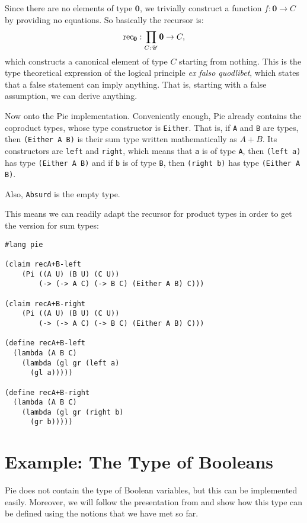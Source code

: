 Since there are no elements of type $ \pmb{0} $, we trivially construct
a function $ f : \pmb{0} \to C $ by providing no equations. So basically
the recursor is:
\[
  \mathrm{rec}_{\pmb{0}} : \prod_{C : \mathscr{U}} \pmb{0} \to C,
\]
which constructs a canonical element of type $ C $ starting from nothing.
This is the type theoretical expression of the logical principle
\emph{ex falso quodlibet}, which states that a false statement can imply
anything. That is, starting with a false assumption, we can derive anything.

\vspace{0.3cm}

Now onto the Pie implementation. Conveniently enough, Pie already contains
the coproduct types, whose type constructor is \texttt{Either}. That is,
if \texttt{A} and \texttt{B} are types, then \texttt{(Either A B)} is their
sum type written mathematically as $ A + B $. Its constructors are
\texttt{left} and \texttt{right}, which means that \texttt{a} is of type
\texttt{A}, then \texttt{(left a)} has type \texttt{(Either A B)}
and if \texttt{b} is of type \texttt{B}, then \texttt{(right b)} has
type \texttt{(Either A B)}.

Also, \texttt{Absurd} is the empty type.

This means we can readily adapt the recursor for product types in order to
get the version for sum types:
{
  \small
\begin{verbatim}
#lang pie

(claim recA+B-left
    (Pi ((A U) (B U) (C U))
        (-> (-> A C) (-> B C) (Either A B) C)))

(claim recA+B-right
    (Pi ((A U) (B U) (C U))
        (-> (-> A C) (-> B C) (Either A B) C)))

(define recA+B-left
  (lambda (A B C)
    (lambda (gl gr (left a)
      (gl a)))))

(define recA+B-right
  (lambda (A B C)
    (lambda (gl gr (right b)
      (gr b)))))
\end{verbatim}
}

\section{Example: The Type of Booleans}

Pie does not contain the type of Boolean variables, but this can
be implemented easily. Moreover, we will follow the presentation from
\cite[\S1.8]{hott} and show how this type can be defined using the notions
that we have met so far.

